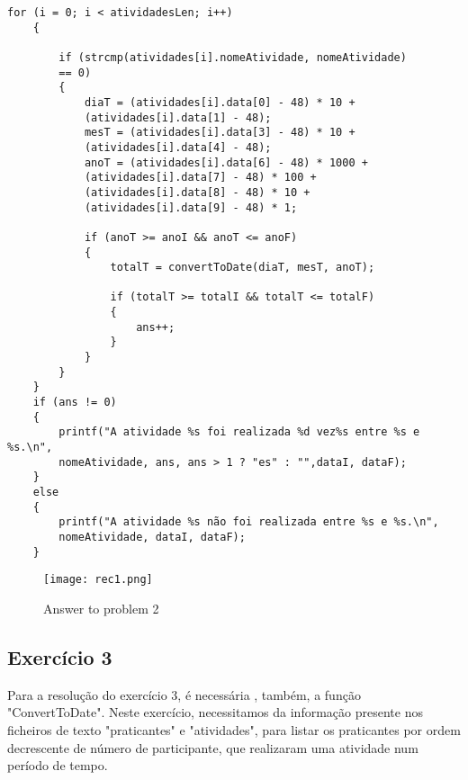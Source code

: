 \begin{lstlisting}[caption=Exemplo exercício 2]
	for (i = 0; i < atividadesLen; i++)
    {
        
        if (strcmp(atividades[i].nomeAtividade, nomeAtividade) 
        == 0)
        {
            diaT = (atividades[i].data[0] - 48) * 10 + 
            (atividades[i].data[1] - 48);
            mesT = (atividades[i].data[3] - 48) * 10 + 
            (atividades[i].data[4] - 48);
            anoT = (atividades[i].data[6] - 48) * 1000 + 
            (atividades[i].data[7] - 48) * 100 + 
            (atividades[i].data[8] - 48) * 10 + 
            (atividades[i].data[9] - 48) * 1;
            
            if (anoT >= anoI && anoT <= anoF)
            {
                totalT = convertToDate(diaT, mesT, anoT);
                
                if (totalT >= totalI && totalT <= totalF)
                {
                    ans++;
                }
            }
        }
    }
    if (ans != 0)
    {
        printf("A atividade %s foi realizada %d vez%s entre %s e %s.\n",
        nomeAtividade, ans, ans > 1 ? "es" : "",dataI, dataF);
    }
    else
    {
        printf("A atividade %s não foi realizada entre %s e %s.\n",
        nomeAtividade, dataI, dataF);
    }
\end{lstlisting}


\begin{figure}[htbp]
\centering
\texttt{[image: rec1.png]}  %
\caption{Answer to problem 2}
\label{fig:ex2}
\end{figure}

\subsection{Exercício 3}
Para a resolução do exercício 3, é necessária , também, a função "ConvertToDate". Neste exercício, necessitamos da informação presente nos ficheiros de texto "praticantes" e "atividades", para listar os praticantes por ordem decrescente de número de participante, que realizaram uma atividade num período de tempo.


